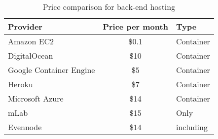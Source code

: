 \begin{table}
\caption{Price comparison for back-end hosting}
\label{tbl:hosting}

\begin{tabularx}{\textwidth}{LcL}
\textbf{Provider} & \textbf{Price per month} & \textbf{Type} \\
\hline
Amazon EC2                  & \$0.1 & Container \\
DigitalOcean                & \$10  & Container \\
Google Container Engine     & \$5   & Container \\
Heroku                      & \$7   & Container \\
Microsoft Azure             & \$14  & Container \\
mLab                        & \$15  & Only  \\
Evennode                    & \$14  &  including  \\
\hline
\end{tabularx}
\end{table}
